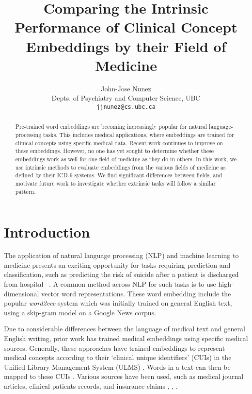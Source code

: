 \documentclass[11pt,a4paper]{article}
\title{Comparing the Intrinsic Performance of Clinical Concept Embeddings by their Field of Medicine}
\author{John-Jose Nunez\\
  Depts. of Psychiatry and Computer Science, UBC\\
  {\tt jjnunez@cs.ubc.ca} 
}
\date{}
\begin{document}
\maketitle
\begin{abstract}
	Pre-trained word embeddings are becoming increasingly popular for natural language-processing tasks. This includes medical applications, where embeddings are trained for clinical concepts using specific medical data. Recent work continues to improve on these embeddings. However, no one has yet sought to determine whether these embeddings work as well for one field of medicine as they do in others. In this work, we use intrinsic methods to evaluate embeddings from the various fields of medicine as defined by their ICD-9 systems. We find significant differences between fields, and motivate future work to investigate whether extrinsic tasks will follow a similar pattern. 
\end{abstract}

\section{Introduction}

The application of natural language processing (NLP) and machine learning to medicine presents an exciting opportunity for tasks requiring prediction and classification, such as predicting the risk of suicide after a patient is discharged from hospital ~\cite{mccoyImprovingPredictionSuicide2016}. A common method across NLP for such tasks is to use high-dimensional vector word representations. These word embedding include the popular \emph{word2vec} system \cite{mikolovEfficientEstimationWord2013} which was initially trained on general English text, using a skip-gram model on a Google News corpus.

Due to considerable differences between the language of medical text and general English writing, prior work has trained medical embeddings using specific medical sources. Generally, these approaches have trained embeddings to represent medical concepts according to their `clinical unique identifiers' (CUIs) in the Unified Library Management System (ULMS) \cite{bodenreiderUnifiedMedicalLanguage2004}. Words in a text can then be mapped to these CUIs \cite{yuShortIntroductionNILE2013}. Various sources have been used, such as medical journal articles, clinical patients records, and insurance claims \cite{devineMedicalSemanticSimilarity2014}, \cite{minarro-gimenezExploringApplicationDeep2014},  \cite{choiLearningLowDimensionalRepresentations2016}.  
\end{document}
